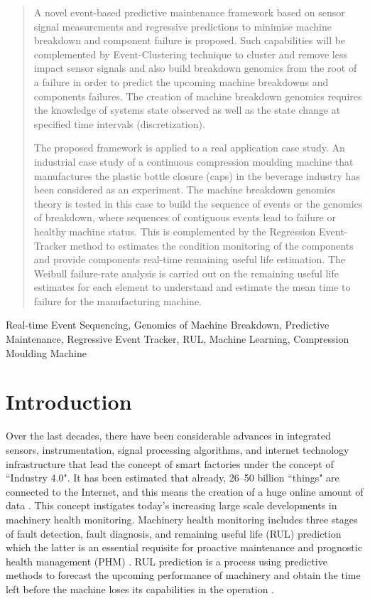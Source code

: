 \documentclass[conference]{IEEEtran}
\begin{document}
\begin{abstract}
A novel event-based predictive maintenance framework based on sensor signal measurements and regressive predictions to minimise machine breakdown and component failure is proposed. Such capabilities will be complemented by Event-Clustering technique to cluster and remove less impact sensor signals and also build breakdown genomics from the root of a failure in order to predict the upcoming machine breakdowns and components failures.  The creation of machine breakdown genomics requires the knowledge of systems state observed as well as the state change at specified time intervals (discretization).

The proposed framework is applied to a real application case study. An industrial case study of a continuous compression moulding machine that manufactures the plastic bottle closure (caps) in the beverage industry has been considered as an experiment. The machine breakdown genomics theory is tested in this case to build the sequence of events or the genomics of breakdown, where sequences of contiguous events lead to failure or healthy machine status. This is complemented by the Regression Event-Tracker method to estimates the condition monitoring of the components and provide components real-time remaining useful life estimation. The Weibull failure-rate analysis is carried out on the remaining useful life estimates for each element to understand and estimate the mean time to failure for the manufacturing machine.
\end{abstract}

\begin{IEEEkeywords}
Real-time Event Sequencing, Genomics of Machine Breakdown, Predictive Maintenance, Regressive Event Tracker, RUL, Machine Learning, Compression Moulding Machine
\end{IEEEkeywords}


\section{Introduction}
\label{sec:Introduction}
Over the last decades, there have been considerable advances in integrated sensors, instrumentation, signal processing algorithms, and internet technology infrastructure that lead the concept of smart factories under the concept of ``Industry 4.0". It has been estimated that already, \numrange{26}{50} billion ``things" are connected to the Internet, and this means the creation of a huge online amount of data \cite{Kumar2019}. This concept instigates today's increasing large scale developments in machinery health monitoring.  Machinery health monitoring includes three stages of fault detection, fault diagnosis, and remaining useful life (RUL) prediction which the latter is an essential requisite for proactive maintenance and prognostic health management (PHM) \cite{Jin2019}. RUL prediction is a process using predictive methods to forecast the upcoming performance of machinery and obtain the time left before the machine loses its capabilities in the operation \cite{Zhao2015}.
\end{document}
